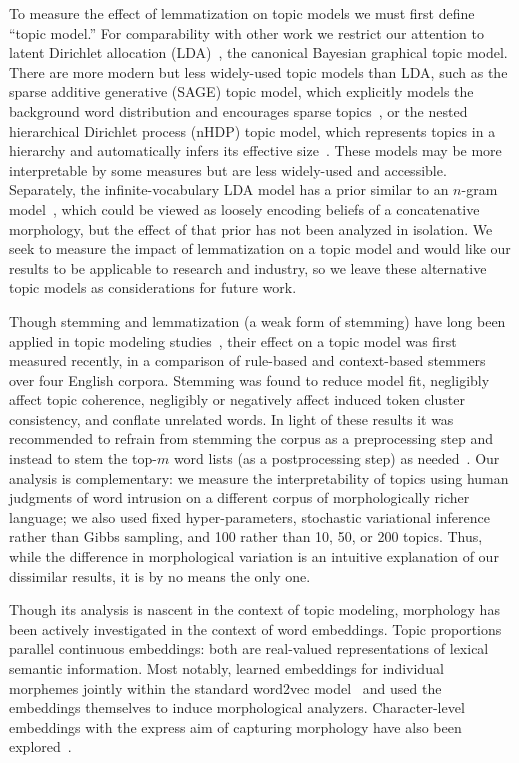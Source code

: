 \documentclass[11pt,letterpaper]{article}
\begin{document}
{To measure the effect of lemmatization on topic models we must first
define ``topic model.''  For comparability with other
work we restrict our attention to latent Dirichlet allocation
(LDA)~\cite{blei2003}, the canonical Bayesian graphical topic model.
There are more modern but less widely-used topic models than
LDA, such as the sparse additive generative
(SAGE) topic model, which explicitly models the background word
distribution and encourages sparse topics~\cite{eisenstein2011}, or the
nested hierarchical Dirichlet process (nHDP) topic model, which
represents topics in a hierarchy and automatically infers its effective
size~\cite{paisley2015}.  These models may be more interpretable by
some measures but are less widely-used and accessible.
Separately, the infinite-vocabulary LDA model has a
prior similar to an $n$-gram model~\cite{zhai2013}, which could be
viewed as loosely encoding beliefs of a concatenative morphology, but
the effect of that prior has not been analyzed in isolation.
We seek to measure the impact of
lemmatization on a topic model and would like our results to be
applicable to research and industry, so we leave these
alternative topic models as considerations for future work.

Though stemming and lemmatization (a weak form of stemming) have long
been applied in topic modeling
studies~\cite{deerwester1990,hofmann1999,mei2007,nallapati2008,lin2009},
their effect on a topic model was first measured recently, in a
comparison of rule-based and context-based stemmers over four
English corpora.
Stemming was found to reduce model fit, negligibly
affect topic coherence, negligibly or negatively affect induced token
cluster consistency, and conflate unrelated words.
In light of these results it was
recommended to refrain from stemming the corpus as a preprocessing
step and instead to stem the top-$m$ word lists (as a postprocessing
step) as needed~\cite{schofield2016}.
Our analysis is complementary: we measure the
interpretability of topics using human judgments of word intrusion on a
different corpus of morphologically richer language; we also used fixed
hyper-parameters, stochastic variational inference rather than Gibbs
sampling, and 100 rather than 10, 50, or 200 topics.  Thus, while the
difference in morphological variation is an intuitive explanation of
our dissimilar results, it is by no means the only one.

Though its analysis is nascent in the context of topic
modeling, morphology has been actively investigated in the context of
word embeddings.  Topic proportions parallel continuous embeddings:
both are real-valued representations of lexical semantic
information. Most notably,  learned
embeddings for individual morphemes jointly within the standard {\sc word2vec}
model~\cite{mikolov2013distributed} and  used the embeddings
themselves to induce morphological analyzers. Character-level
embeddings with the express aim of capturing morphology have also been
explored~\cite{santos2014learning,LingDBTFAML15}.

}
\end{document}
